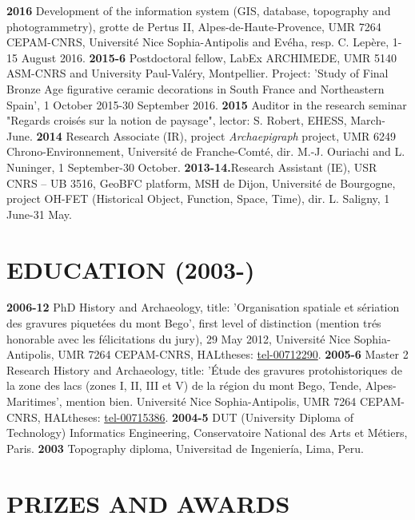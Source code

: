 \documentclass{article}
\begin{document}
\smallbreak
\textbf{2016 }Development of the information system (GIS, database, topography and photogrammetry), grotte de Pertus II, Alpes-de-Haute-Provence, UMR 7264 CEPAM-CNRS, Universit\'{e} Nice Sophia-Antipolis and Ev\'{e}ha, resp. C. Lep\`{e}re, 1-15 August 2016.
\smallbreak
\textbf{2015-6 }Postdoctoral fellow, LabEx ARCHIMEDE, UMR 5140 ASM-CNRS and University Paul-Val\'{e}ry, Montpellier. Project: 'Study of Final Bronze Age figurative ceramic decorations in South France and Northeastern Spain', 1 October 2015-30 September 2016.
\smallbreak
\textbf{2015 }Auditor in the research seminar "Regards crois\'{e}s sur la notion de paysage", lector: S. Robert, EHESS, March-June.\textbf{}
\smallbreak
\textbf{2014 }Research\textbf{ }Associate (IR), project \textit{Archaepigraph} project, UMR 6249 Chrono-Environnement, Universit\'{e} de Franche-Comt\'{e}, dir. M.-J. Ouriachi and L. Nuninger, 1 September-30 October.
\smallbreak
\textbf{2013-14.}Research Assistant (IE), USR CNRS -- UB 3516, GeoBFC platform, MSH de Dijon, Universit\'{e} de Bourgogne, project OH-FET (Historical Object, Function, Space, Time), dir. L. Saligny, 1 June-31 May.

\section{EDUCATION (2003-)}

\textbf{2006-12 }PhD History and Archaeology, title: 'Organisation spatiale et s\'{e}riation des gravures piquet\'{e}es du mont Bego', first level of distinction (mention tr\'{e}s honorable avec les f\'{e}licitations du jury), 29 May 2012, Universit\'{e} Nice Sophia-Antipolis, UMR 7264 CEPAM-CNRS, HALtheses: \href{https://tel.archives-ouvertes.fr/tel-00712290}{tel-00712290}.
\smallbreak
\textbf{2005-6 }Master 2 Research History and Archaeology, title: '\'{E}tude des gravures protohistoriques de la zone des lacs (zones I, II, III et V) de la r\'{e}gion du mont Bego, Tende, Alpes-Maritimes', mention bien. Universit\'{e} Nice Sophia-Antipolis, UMR 7264 CEPAM-CNRS, HALtheses: \href{https://tel.archives-ouvertes.fr/tel-00715386}{tel-00715386}.
\smallbreak
\textbf{2004-5 }DUT (University Diploma of Technology) Informatics Engineering, Conservatoire National des Arts et M\'{e}tiers, Paris.
\smallbreak
\textbf{2003 } Topography diploma, Universitad de Ingenier\'{i}a, Lima, Peru.

\section{PRIZES AND AWARDS}
\end{document}
